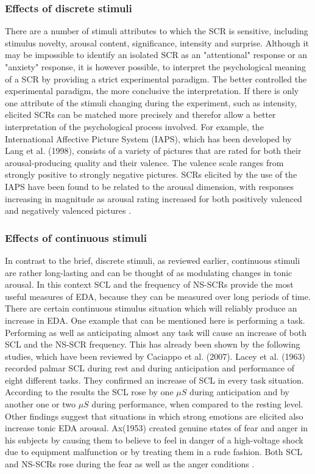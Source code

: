 \subsubsection{Effects of discrete stimuli} 
There are a number of stimuli attributes to which the SCR is sensitive, including stimulus novelty, arousal content, significance, intensity and surprise. Although it may be impossible to identify an isolated SCR as an "attentional" response or an "anxiety" response, it is however possible, to interpret the psychological meaning of a SCR by providing a strict experimental paradigm. The better controlled the experimental paradigm, the more conclusive the interpretation. If there is only one attribute of the stimuli changing during the experiment, such as intensity, elicited SCRs can be matched more precisely and therefor allow a better interpretation of the psychological process involved. For example, the International Affective Picture System (IAPS), which has been developed by Lang et al. (1998), consists of a variety of pictures that are rated for both their arousal-producing quality and their valence. The valence scale ranges from strongly positive to strongly negative pictures. SCRs elicited by the use of the IAPS have been found to be related to the arousal dimension, with responses increasing  in magnitude as arousal rating increased for both positively valenced and negatively valenced pictures \cite{HANDBOOKPP}.

\subsubsection{Effects of continuous stimuli} 
In contrast to the brief, discrete stimuli, as reviewed earlier, continuous stimuli are rather long-lasting and can be thought of as modulating changes in tonic arousal. In this context SCL and the frequency of NS-SCRs provide the most useful measures of EDA, because they can be measured over long periods of time. There are certain continuous stimulus situation which will reliably produce an increase in EDA. One example that can be mentioned here is performing a task. Performing as well as anticipating almost any task will cause an increase of both SCL and the NS-SCR frequency. This has already been shown by the following studies, which have been reviewed by Caciappo et al. (2007). Lacey et al. (1963) recorded palmar SCL during rest and during anticipation and performance of eight different tasks. They confirmed an increase of SCL in every task situation. According to the results the SCL rose by one $\mu S$ during anticipation and by another one or two $\mu S$ during performance, when compared to the resting level. Other findings suggest that situations in which strong emotions are elicited also increase tonic EDA arousal. Ax(1953) created genuine states of fear and anger in his subjects by causing them to believe to feel in danger of a high-voltage shock due to equipment malfunction or by treating them in a rude fashion. Both SCL and NS-SCRs rose during the fear as well as the anger conditions \cite{HANDBOOKPP}. 


